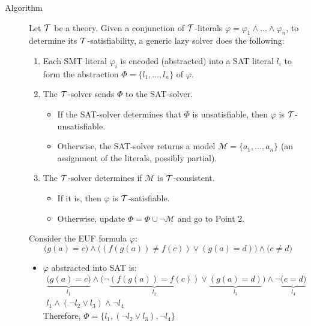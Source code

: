 \begin{description}
    \item[Algorithm] \phantom{}
        Let $\mathcal{T}$ be a theory.
        Given a conjunction of $\mathcal{T}$-literals $\varphi = \varphi_1 \land \dots \land \varphi_n$, 
        to determine its $\mathcal{T}$-satisfiability, a generic lazy solver does the following:
        \begin{enumerate}
            \item Each SMT literal $\varphi_i$ is encoded (abstracted) into a SAT literal $l_i$ to form the abstraction $\Phi = \{ l_1, \dots, l_n \} $ of $\varphi$.
            \item The $\mathcal{T}$-solver sends $\Phi$ to the SAT-solver.
                \begin{itemize}
                    \item If the SAT-solver determines that $\Phi$ is unsatisfiable, then $\varphi$ is $\mathcal{T}$-unsatisfiable.
                    \item Otherwise, the SAT-solver returns a model $\mathcal{M} = \{ a_1, \dots, a_n \}$ (an assignment of the literals, possibly partial).
                \end{itemize}
            \item The $\mathcal{T}$-solver determines if $\mathcal{M}$ is $\mathcal{T}$-consistent.
                \begin{itemize}
                    \item If it is, then $\varphi$ is $\mathcal{T}$-satisfiable.
                    \item Otherwise, update $\Phi = \Phi \cup \lnot \mathcal{M}$ and go to Point 2.
                \end{itemize}
        \end{enumerate}

        \begin{example}
            Consider the EUF formula $\varphi$:
            \[ \big( g(a) = c \big) \land \big( (f(g(a)) \neq f(c)) \vee (g(a) = d) \big) \land \big( c \neq d \big) \]
            
            \begin{itemize}
                \item $\varphi$ abstracted into SAT is:
                    \begin{gather*}
                        \underbrace{ \big( g(a) = c \big) }_{l_1} \land 
                        \big(
                            \lnot\underbrace{ (f(g(a)) = f(c)) }_{l_2} \vee 
                            \underbrace{ (g(a) = d) }_{l_3}
                        \big) \land 
                        \lnot\underbrace{ \big( c = d \big) }_{l_4} \\
                        l_1 \land (\lnot l_2 \vee l_3) \land \lnot l_4
                    \end{gather*}
                    Therefore, $\Phi = \{ l_1, (\lnot l_2 \vee l_3), \lnot l_4 \}$


\end{itemize}
\end{example}
\end{description}
